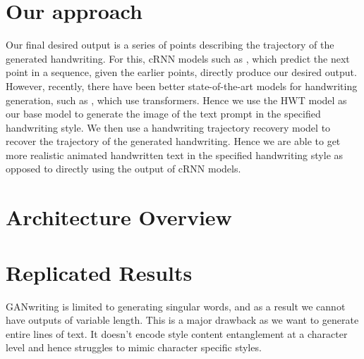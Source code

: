 \documentclass[10pt,twocolumn,letterpaper]{article}
\begin{document}
\section{Our approach}
Our final desired output is a series of points describing the trajectory of the generated handwriting. For this, cRNN models such as \cite{crnn,BRUSH-paper}, which predict the next point in a sequence, given the earlier points, directly produce our desired output. However, recently, there have been better state-of-the-art models for handwriting generation, such as \cite{HWT}, which use transformers. Hence we use the HWT model\cite{HWT} as our base model to generate the image of the text prompt in the specified handwriting style. We then use a handwriting trajectory recovery model \cite{image2stroke-1Char,img2stroke-multichar} to recover the trajectory of the generated handwriting. Hence we are able to get more realistic animated handwritten text in the specified handwriting style as opposed to directly using the output of cRNN models.\\

\section{Architecture Overview}

\section{Replicated Results}

GANwriting \cite{GAN-1} is limited to generating singular words, and as a result we cannot have outputs of variable length. This is a major drawback as we want to generate entire lines of text. It doesn't encode style content entanglement at a character level and hence struggles to mimic character specific styles.\\
\end{document}
